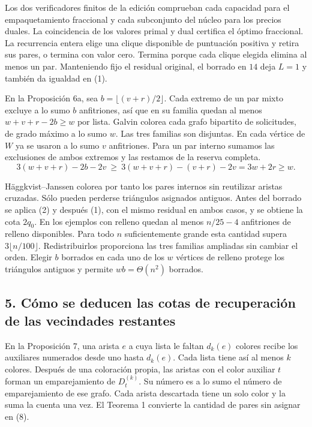 \documentclass[spanish,11pt,a4paper]{article}
\begin{document}
Los dos verificadores finitos de la edición comprueban cada capacidad para el empaquetamiento fraccional y cada subconjunto del núcleo para los precios duales. La coincidencia de los valores primal y dual certifica el óptimo fraccional. La recurrencia entera elige una clique disponible de puntuación positiva y retira sus pares, o termina con valor cero. Termina porque cada clique elegida elimina al menos un par. Manteniendo fijo el residual original, el borrado en \(14\) deja \(L=1\) y también da igualdad en (1).

En la Proposición 6a, sea \(b=\lfloor(v+r)/2\rfloor\). Cada extremo de un par mixto excluye a lo sumo \(b\) anfitriones, así que en su familia quedan al menos \(w+v+r-2b\ge w\) por lista. Galvin colorea cada grafo bipartito de solicitudes, de grado máximo a lo sumo \(w\). Las tres familias son disjuntas. En cada vértice de \(W\) ya se usaron a lo sumo \(v\) anfitriones. Para un par interno sumamos las exclusiones de ambos extremos y las restamos de la reserva completa.
\[
3(w+v+r)-2b-2v\ \ge\ 3(w+v+r)-(v+r)-2v=3w+2r\ge w.
\]

Häggkvist--Janssen colorea por tanto los pares internos sin reutilizar aristas cruzadas. Sólo pueden perderse triángulos asignados antiguos. Antes del borrado se aplica (2) y después (1), con el mismo residual en ambos casos, y se obtiene la cota \(2q_0\). En los ejemplos con relleno quedan al menos \(n/25-4\) anfitriones de relleno disponibles. Para todo \(n\) suficientemente grande esta cantidad supera \(3\lfloor n/100\rfloor\). Redistribuirlos proporciona las tres familias ampliadas sin cambiar el orden. Elegir \(b\) borrados en cada uno de los \(w\) vértices de relleno protege los triángulos antiguos y permite \(wb=\Theta(n^2)\) borrados.

\subsection{5. Cómo se deducen las cotas de recuperación de las vecindades restantes}\label{cuxf3mo-se-deducen-las-cotas-de-recuperaciuxf3n-de-las-vecindades-restantes}

En la Proposición 7, una arista \(e\) a cuya lista le faltan \(d_k(e)\) colores recibe los auxiliares numerados desde uno hasta \(d_k(e)\). Cada lista tiene así al menos \(k\) colores. Después de una coloración propia, las aristas con el color auxiliar \(t\) forman un emparejamiento de \(D_t^{(k)}\). Su número es a lo sumo el número de emparejamiento de ese grafo. Cada arista descartada tiene un solo color y la suma la cuenta una vez. El Teorema 1 convierte la cantidad de pares sin asignar en (8).
\end{document}
